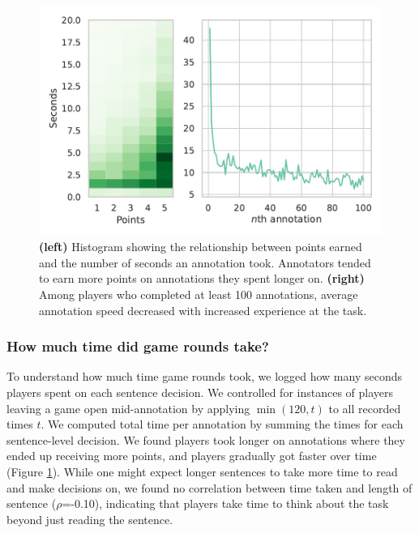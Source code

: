\begin{figure}[ht]
    \centering
    \includegraphics[width=0.7\linewidth]{figures/time_tracking.pdf}
    \caption{\textbf{(left)} Histogram showing the relationship between points earned and the number of seconds an annotation took. Annotators tended to earn more points on annotations they spent longer on.
    \textbf{(right)} Among players who completed at least 100 annotations, average annotation speed decreased with increased experience at the task.
    }
    \label{fig:time_tracking}
\end{figure}


\subsubsection{How much time did game rounds take?}
To understand how much time game rounds took, we logged how many seconds players spent on each sentence decision.
We controlled for instances of players leaving a game open mid-annotation by applying $\min(120, t)$ to all recorded times $t$.
We computed total time per annotation by summing the times for each sentence-level decision.
We found players took longer on annotations where they ended up receiving more points, and players gradually got faster over time (Figure \ref{fig:time_tracking}).
While one might expect longer sentences to take more time to read and make decisions on, we found no correlation between time taken and length of sentence ($\rho$=-0.10), indicating that players take time to think about the task beyond just reading the sentence.

